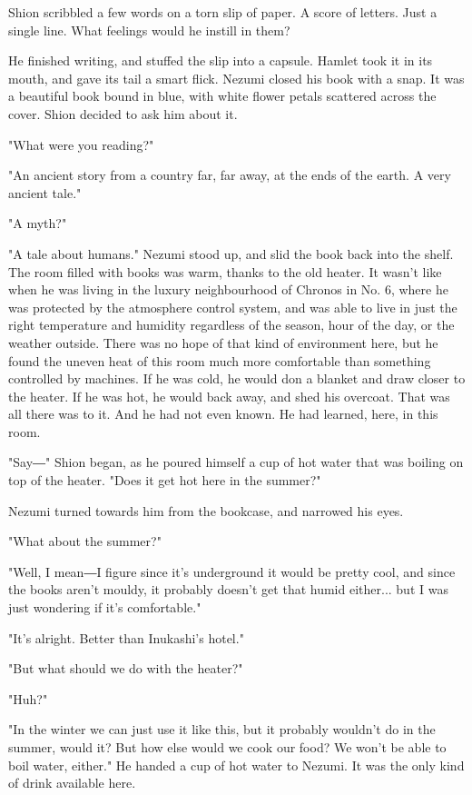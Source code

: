 Shion scribbled a few words on a torn slip of paper. A score of letters.
Just a single line. What feelings would he instill in them?

He finished writing, and stuffed the slip into a capsule. Hamlet took it
in its mouth, and gave its tail a smart flick. Nezumi closed his book
with a snap. It was a beautiful book bound in blue, with white flower
petals scattered across the cover. Shion decided to ask him about it.

"What were you reading?"

"An ancient story from a country far, far away, at the ends of the
earth. A very ancient tale."

"A myth?"

"A tale about humans." Nezumi stood up, and slid the book back into the
shelf. The room filled with books was warm, thanks to the old heater. It
wasn't like when he was living in the luxury neighbourhood of Chronos in
No. 6, where he was protected by the atmosphere control system, and was
able to live in just the right temperature and humidity regardless of
the season, hour of the day, or the weather outside. There was no hope
of that kind of environment here, but he found the uneven heat of this
room much more comfortable than something controlled by machines. If he
was cold, he would don a blanket and draw closer to the heater. If he
was hot, he would back away, and shed his overcoat. That was all there
was to it. And he had not even known. He had learned, here, in this
room.

"Say―" Shion began, as he poured himself a cup of hot water that was
boiling on top of the heater. "Does it get hot here in the summer?"

Nezumi turned towards him from the bookcase, and narrowed his eyes.

"What about the summer?"

"Well, I mean―I figure since it's underground it would be pretty cool,
and since the books aren't mouldy, it probably doesn't get that humid
either... but I was just wondering if it's comfortable."

"It's alright. Better than Inukashi's hotel."

"But what should we do with the heater?"

"Huh?"

"In the winter we can just use it like this, but it probably wouldn't do
in the summer, would it? But how else would we cook our food? We won't
be able to boil water, either." He handed a cup of hot water to Nezumi.
It was the only kind of drink available here.

